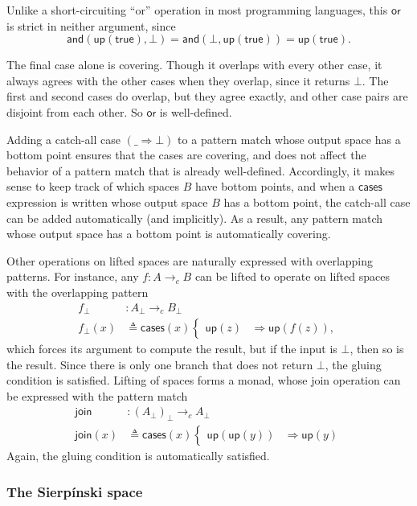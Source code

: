 \documentclass[conference]{IEEEtran}
\newcommand{\cto}{\to_c}
\newcommand{\wildcard}{\_}
\newcommand{\Branch}{\Rightarrow}
\newcommand{\up}{\mathsf{up}}
\begin{document}
Unlike a short-circuiting ``or'' operation in most programming languages, this $\mathsf{or}$ is strict in neither argument, since
\[ 
\mathsf{and}(\mathsf{up}(\mathsf{true}), \bot) = 
\mathsf{and}(\bot, \mathsf{up}(\mathsf{true})) =
\mathsf{up}(\mathsf{true}).
\]

The final case alone is covering. Though it overlaps with every other case, it always agrees with the other cases when they overlap, since it returns $\bot$. The first and second cases do overlap, but they agree exactly, and other case pairs are disjoint from each other. So $\mathsf{or}$ is well-defined.

Adding a catch-all case $(\wildcard \Branch \bot)$ to a pattern match whose output space has a bottom point ensures that the cases are covering, and does not affect the behavior of a pattern match that is already well-defined. Accordingly, it makes sense to keep track of which spaces $B$ have bottom points, and when a $\mathsf{cases}$ expression is written whose output space $B$ has a bottom point, the catch-all case can be added automatically (and implicitly). As a result, any pattern match whose output space has a bottom point is automatically covering.

Other operations on lifted spaces are naturally expressed with overlapping patterns. For instance, any $f : A \cto B$ can be lifted to operate on lifted spaces with the overlapping pattern
\begin{align*}
f_\bot &: A_\bot \cto B_\bot
\\ f_\bot(x) &\triangleq
  \mathsf{cases}(x)
  \begin{cases}
  \up(z) &\Branch \up(f(z)),
  \end{cases}
\end{align*}
which forces its argument to compute the result, but if the input is $\bot$, then so is the result. Since there is only one branch that does not return $\bot$, the gluing condition is satisfied. Lifting of spaces forms a monad, whose join operation can be expressed with the pattern match
\begin{align*}
\mathsf{join} &: \left( A_\bot \right)_\bot \cto A_\bot
\\ \mathsf{join}(x) &\triangleq \mathsf{cases}(x)
\begin{cases}
\up(\up(y)) &\Branch \up(y)
\end{cases}
\end{align*}
Again, the gluing condition is automatically satisfied.

\subsubsection{The Sierp\'inski space}
\end{document}
